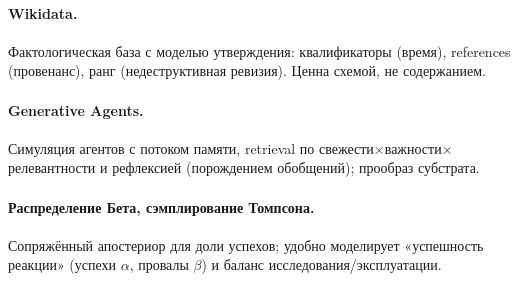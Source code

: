 \paragraph{Wikidata.} Фактологическая база с моделью утверждения: квалификаторы
(время), references (провенанс), ранг (недеструктивная ревизия). Ценна схемой, не
содержанием.

\paragraph{Generative Agents.} Симуляция агентов с потоком памяти, retrieval по
свежести$\times$важности$\times$релевантности и рефлексией (порождением обобщений);
прообраз субстрата.

\paragraph{Распределение Бета, сэмплирование Томпсона.} Сопряжённый апостериор для
доли успехов; удобно моделирует «успешность реакции» (успехи $\alpha$, провалы
$\beta$) и баланс исследования/эксплуатации.
